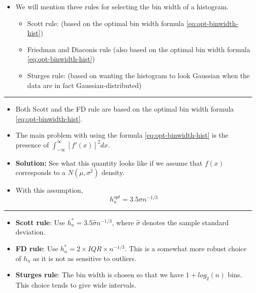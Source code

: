 \documentclass[]{book}
\providecommand{\tightlist}{%
  \setlength{\itemsep}{0pt}\setlength{\parskip}{0pt}}
\begin{document}
\begin{itemize}
\tightlist
\item
  We will mention three rules for selecting the bin width of a histogram.

  \begin{itemize}
  \tightlist
  \item
    Scott rule: (based on the optimal bin width formula \eqref{eq:opt-binwidth-hist})
  \item
    Friedman and Diaconis rule (also based on the optimal bin width formula \eqref{eq:opt-binwidth-hist})
  \item
    Sturges rule: (based on wanting the histogram to look Gaussian when the data are in fact Gaussian-distributed)
  \end{itemize}
\end{itemize}

\begin{center}\rule{0.5\linewidth}{\linethickness}\end{center}

\begin{itemize}
\item
  Both Scott and the FD rule are based on the optimal bin width formula \eqref{eq:opt-binwidth-hist}.
\item
  The main problem with using the formula \eqref{eq:opt-binwidth-hist} is the presence of \(\int_{-\infty}^{\infty} [f'(x)]^{2} dx\).
\item
  \textbf{Solution:} See what this quantity looks like if we assume that \(f(x)\) corresponds
  to a \(N(\mu, \sigma^{2})\) density.
\item
  With this assumption,
  \begin{equation}
  h_{n}^{opt} = 3.5 \sigma n^{-1/3}  \nonumber
  \end{equation}
\end{itemize}

\begin{center}\rule{0.5\linewidth}{\linethickness}\end{center}

\begin{itemize}
\item
  \textbf{Scott rule}: Use \(h_{n}^{*} = 3.5 \hat{\sigma} n^{-1/3}\), where \(\hat{\sigma}\) denotes the sample standard deviation.
\item
  \textbf{FD rule}: Use \(h_{n}^{*} = 2 \times IQR \times n^{-1/3}\). This is a somewhat more robust choice of \(h_{n}\) as it is not as
  sensitive to outliers.
\item
  \textbf{Sturges rule}: The bin width is chosen so that we have \(1 + log_{2}(n)\) bins. This choice tends to give wide
  intervals.
\end{itemize}
\end{document}
